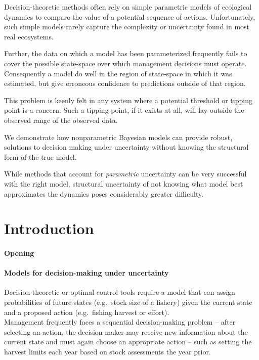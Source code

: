 \documentclass[author-year, review]{elsarticle} %
\begin{document}
Decision-theoretic methods often rely on simple parametric models of
ecological dynamics to compare the value of a potential sequence of
actions. Unfortunately, such simple models rarely capture the complexity
or uncertainty found in most real ecosystems.

Further, the data on which a model has been parameterized frequently
fails to cover the possible state-space over which management decisions
must operate. Consequently a model do well in the region of state-space
in which it was estimated, but give erroneous confidence to predictions
outside of that region.

This problem is keenly felt in any system where a potential threshold or
tipping point is a concern. Such a tipping point, if it exists at all,
will lay outside the observed range of the observed data.

We demonstrate how nonparametric Bayesian models can provide robust,
solutions to decision making under uncertainty without knowing the
structural form of the true model.

While methods that account for \emph{parametric} uncertainty can be very
successful with the right model, structural uncertainty of not knowing
what model best approximates the dynamics poses considerably greater
difficulty.

\section{Introduction}\label{introduction-1}

\paragraph{Opening}\label{opening}

\paragraph{Models for decision-making under
uncertainty}\label{models-for-decision-making-under-uncertainty}

Decision-theoretic or optimal control tools require a model that can
assign probabilities of future states (e.g.~stock size of a fishery)
given the current state and a proposed action (e.g.~fishing harvest or
effort).\\Management frequently faces a sequential decision-making
problem -- after selecting an action, the decision-maker may receive new
information about the current state and must again choose an appropriate
action -- such as setting the harvest limits each year based on stock
assessments the year prior.
\end{document}
